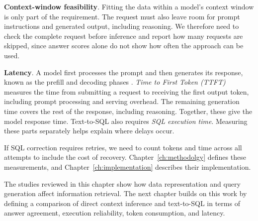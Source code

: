 \textbf{Context-window feasibility}. Fitting the data within a model's context window is only part of the
requirement. The request must also leave room for prompt instructions and generated output, including
reasoning. We therefore need to check the complete request before inference and report how many requests are
skipped, since answer scores alone do not show how often the approach can be used.

\textbf{Latency}. A model first processes the prompt and then generates its response, known as the prefill
and decoding phases \cite{zhong2024distserve}. \emph{Time to First Token (TTFT)} measures the time from
submitting a request to receiving the first output token, including prompt processing and serving overhead.
The remaining generation time covers the rest of the response, including reasoning. Together, these give the
model response time. Text-to-SQL also requires \emph{SQL execution time}. Measuring these parts separately
helps explain where delays occur.

If SQL correction requires retries, we need to count tokens and time across all attempts to include the cost
of recovery. Chapter~\ref{ch:methodolgy} defines these measurements, and Chapter~\ref{ch:implementation}
describes their implementation.

The studies reviewed in this chapter show how data representation and query generation affect information
retrieval. The next chapter builds on this work by defining a comparison of direct context inference and
text-to-SQL in terms of answer agreement, execution reliability, token consumption, and latency.
